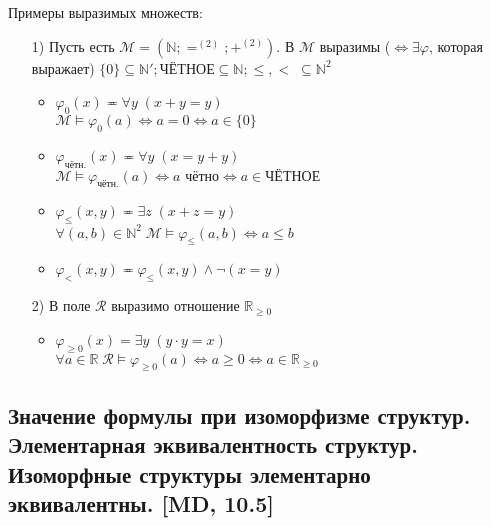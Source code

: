 \documentclass[a4paper, fleqn]{article}
\begin{document}
    Примеры выразимых множеств: \\
    \begin{enumerate}
        \item[1)] Пусть есть $\mathcal{M} = (\mathbb{N}; =^{(2)}; +^{(2)})$. В $\mathcal{M}$ выразимы ($\Leftrightarrow \exists \varphi$, которая выражает) $\{0\} \subseteq \mathbb{N}'; \text{ЧЁТНОЕ} \subseteq \mathbb{N}; \leq, < \; \subseteq \mathbb{N}^2$ \\
        \begin{itemize}
            \item $\varphi_0(x) \eqcirc \forall y \; (x + y = y)$ \\
            $\mathcal{M} \vDash \varphi_0(a) \Leftrightarrow a = 0 \Leftrightarrow a \in \{0\}$ \\
            \item $\varphi_{\text{чётн.}}(x) \eqcirc \forall y \; (x = y + y)$ \\
            $\mathcal{M} \vDash \varphi_{\text{чётн.}}(a) \Leftrightarrow a\text{ чётно} \Leftrightarrow a \in \text{ЧЁТНОЕ}$ \\
            \item $\varphi_{\leq}(x, y) \eqcirc \exists z \; (x + z = y)$ \\
            $\forall (a, b) \in \mathbb{N}^2 \; \mathcal{M} \vDash \varphi_{\leq}(a, b) \Leftrightarrow a \leq b$ \\
            \item $\varphi_{<}(x, y) \eqcirc \varphi_{\leq}(x, y) \wedge \neg (x = y)$
        \end{itemize}
        \item[2)] В поле $\mathcal{R}$ выразимо отношение $\mathbb{R}_{\geq 0}$ \\
        \begin{itemize}
            \item $\varphi_{\geq 0}(x) = \exists y \; (y \cdot y = x)$ \\
            $\forall a \in \mathbb{R} \; \mathcal{R} \vDash \varphi_{\geq 0}(a) \Leftrightarrow a \geq 0 \Leftrightarrow a \in \mathbb{R}_{\geq 0}$
        \end{itemize}
    \end{enumerate}
    \subsection{Значение формулы при изоморфизме структур. Элементарная эквивалентность структур. Изоморфные структуры элементарно эквивалентны. [MD, 10.5]}
 
\end{document}
